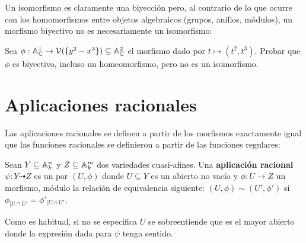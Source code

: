 \documentclass[ACGA.tex]{subfiles}
\begin{document}

Un isomorfismo es claramente una biyección pero, al contrario de lo que ocurre con los homomorfismos entre objetos algebraicos (grupos, anillos, módulos), un morfismo biyectivo no es necesariamente un isomorfismo:

\begin{ejer}
 Sea $\phi:\mathbb{A}^1_{\mathbb{C}}\to\mathcal{V}(\{y^2-x^3\})\subseteq\mathbb{A}^2_{\mathbb{C}}$ el morfismo dado por $t\mapsto (t^2,t^3)$. Probar que $\phi$ es biyectivo, incluso un homeomorfismo, pero no es un isomorfismo.
\end{ejer}

\section{Aplicaciones racionales}

Las aplicaciones racionales se definen a partir de los morfismos exactamente igual que las funciones racionales se definieron a partir de las funciones regulares:

\begin{defi}
 Sean $Y\subseteq\mathbb{A}^n_k$ y $Z\subseteq\mathbb{A}^m_k$ dos variedades cuasi-afines. Una {\bf aplicación racional} $\psi:Y\dashrightarrow Z$ es un par $(U,\phi)$ donde $U\subseteq Y$ es un abierto no vacío y $\phi:U\to Z$ un morfismo, módulo la relación de equivalencia siguiente: $(U,\phi)\sim(U',\phi')$ si $\phi_{|U\cap U'}=\phi'_{|U\cap U'}$.
\end{defi}

Como es habitual, si no se especifica $U$ se sobreentiende que es el mayor abierto donde la expresión dada para $\psi$ tenga sentido.
\end{document}
